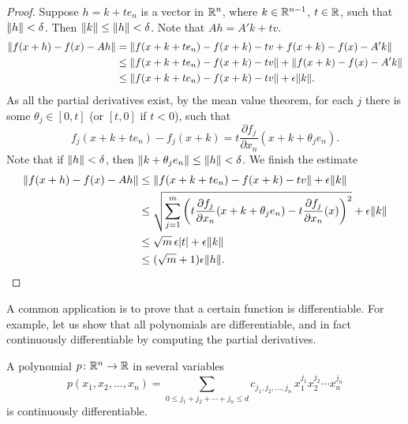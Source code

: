 \begin{proof}
Suppose $h = k + t e_n$ is a vector in ${\mathbb{R}}^n$, where $k \in {\mathbb{R}}^{n-1}$, $t
\in {\mathbb{R}}$, such that
$\lVert {h} \rVert < \delta$.  Then $\lVert {k} \rVert \leq \lVert {h} \rVert < \delta$.
Note that $Ah = A' k + tv$.
\begin{equation*}
\begin{split}
\lVert {f(x+h) - f(x) - Ah} \rVert
& = \lVert {f(x+k + t e_n) - f(x+k) - tv + f(x+k) - f(x) - A' k} \rVert
\\
& \leq \lVert {f(x+k + t e_n) - f(x+k) -tv} \rVert + \lVert {f(x+k) - f(x) -
A' k} \rVert
\\
& \leq \lVert {f(x+k + t e_n) - f(x+k) -tv} \rVert + \epsilon \lVert {k} \rVert .
\end{split}
\end{equation*}
As all the partial derivatives exist, by the mean value theorem,
for each $j$ there is some $\theta_j \in [0,t]$ (or $[t,0]$ if $t < 0$), such that
\begin{equation*}
f_j(x+k + t e_n) - f_j(x+k) =
t \frac{\partial f_j}{\partial x_n}(x+k+\theta_j e_n).
\end{equation*}
Note that if $\lVert {h} \rVert < \delta$, then $\lVert {k+\theta_j e_n} \rVert \leq \lVert {h} \rVert
< \delta$.
We finish the estimate
\begin{equation*}
\begin{split}
\lVert {f(x+h) - f(x) - Ah} \rVert
& \leq \lVert {f(x+k + t e_n) - f(x+k) -tv} \rVert + \epsilon \lVert {k} \rVert
\\
& \leq \sqrt{\sum_{j=1}^m {\left(t\frac{\partial f_j}{\partial
x_n}(x+k+\theta_j e_n) -
t \frac{\partial f_j}{\partial x_n}(x)\right)}^2} + \epsilon \lVert {k} \rVert
\\
& \leq \sqrt{m}\, \epsilon \lvert {t} \rvert + \epsilon \lVert {k} \rVert
\\
& \leq (\sqrt{m}+1)\epsilon \lVert {h} \rVert . \qedhere
\end{split}
\end{equation*}
\end{proof}

A common application is to prove that a certain function is
differentiable.  For example, let us show that all polynomials
are differentiable, and in fact continuously differentiable
by computing the partial derivatives.

\begin{cor}
A polynomial $p \colon {\mathbb{R}}^n \to {\mathbb{R}}$ in several variables
\begin{equation*}
p(x_1,x_2,\ldots,x_n)
=
\sum_{0 \leq j_1+j_2+\cdots+j_n \leq d}
c_{j_1,j_2,\ldots,j_n}
\,
x_1^{j_1}
x_2^{j_2}
\cdots
x_n^{j_n}
\end{equation*}
is continuously differentiable.
\end{cor}

